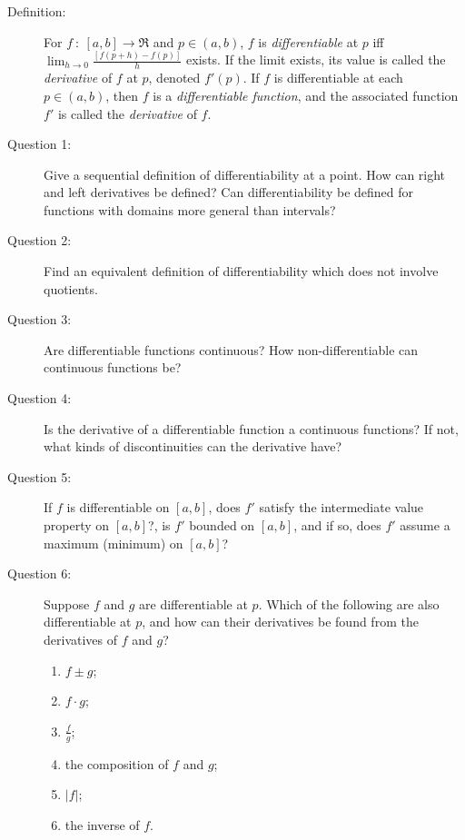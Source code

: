 \documentclass{article}
\begin{document}
\begin{description}

  \item[Definition:] For $f\ :\ [a,b] \to \Re$ and $p \in (a,b)$, $f$ is \emph{differentiable} at $p$ iff $\displaystyle \lim_{h \to 0} \frac{[f(p+h) - f(p)]}{h}$ exists. If the limit exists, its value is called the \emph{derivative} of $f$ at $p$, denoted $f'(p)$. If $f$ is differentiable at each $p \in (a,b)$, then $f$ is a \emph{differentiable function}, and the associated function $f'$ is called the \emph{derivative} of $f$.

  \item[Question 1:] Give a sequential definition of differentiability at a point. How can right and left derivatives be defined? Can differentiability be defined for functions with domains more general than intervals?

  \item[Question 2:] Find an equivalent definition of differentiability which does not involve quotients.

  \item[Question 3:] Are differentiable functions continuous? How non-differentiable can continuous functions be?

  \item[Question 4:] Is the derivative of a differentiable function a continuous functions? If not, what kinds of discontinuities can the derivative have?

  \item[Question 5:] If $f$ is differentiable on $[a,b]$, does $f'$ satisfy the intermediate value property on $[a,b]$?, is $f'$ bounded on $[a,b]$, and if so, does $f'$ assume a maximum (minimum) on $[a,b]$?

  \item[Question 6:] Suppose $f$ and $g$ are differentiable at $p$. Which of the following are also differentiable at $p$, and how can their derivatives be found from the derivatives of $f$ and $g$?
    \begin{enumerate}[\hspace{1cm}(1)]
      \item $f \pm g$;
      \item $f \cdot g$;
      \item $\frac{f}{g}$;
      \item the composition of $f$ and $g$;
      \item $|f|$;
      \item the inverse of $f$.
    \end{enumerate}


\end{description}
\end{document}
